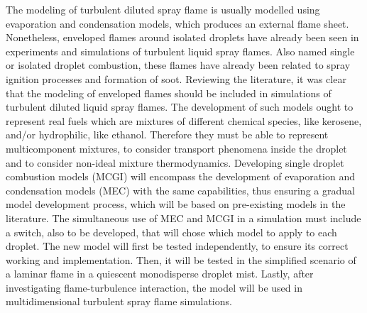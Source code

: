 {

\noindent %
The modeling of turbulent diluted spray flame is usually modelled using evaporation and condensation models, which produces an external flame sheet.
Nonetheless, enveloped flames around isolated droplets have already been seen in experiments and simulations of turbulent liquid spray flames.
Also named single or isolated droplet combustion, these flames have already been related to spray ignition processes and formation of soot. Reviewing the literature, it was clear that the modeling of enveloped flames should be included in simulations of turbulent diluted liquid spray flames. The development of such models ought to represent real fuels which are mixtures of different chemical species, like kerosene, and/or hydrophilic, like ethanol.
Therefore they must be able to represent multicomponent mixtures, to consider transport phenomena inside the droplet and to consider non-ideal mixture thermodynamics.
Developing single droplet combustion models (MCGI) will encompass the development of evaporation and condensation models (MEC) with the same capabilities, thus ensuring a gradual model development process, which will be based on pre-existing models in the literature.
The simultaneous use of MEC and MCGI in a simulation must include a switch, also to be developed, that will chose which model to apply to each droplet.
The new model will first be tested independently, to ensure its correct working and implementation.
Then, it will be tested in the simplified scenario of a laminar flame in a quiescent monodisperse droplet mist.
Lastly, after investigating flame-turbulence interaction, the model will be used in multidimensional turbulent spray flame simulations.

}